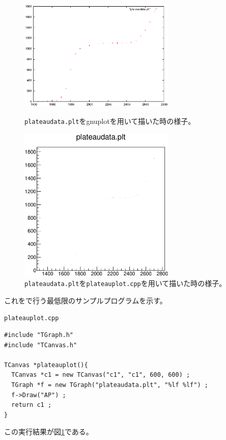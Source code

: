 \begin{figure}[htbp]
  \begin{minipage}{0.47\hsize}
   \begin{center}
    \includegraphics[width = 75mm]{./picture/plateaugnuplot.eps}
   \end{center}
   \caption{\texttt{plateaudata.plt}をgnuplotを用いて描いた時の様子。}
   \label{Fig:plateaugnuplot}
  \end{minipage}
  \begin{minipage}{0.53\hsize}
   \begin{center}
    \includegraphics[width = 75mm]{./picture/plateaucanvas1.eps}
   \end{center}
   \caption{\texttt{plateaudata.plt}を\texttt{plateauplot.cpp}を用いて描いた時の様子。}
   \label{Fig:plateaucanvas1}
  \end{minipage}
 \end{figure}
 
 これを\ROOT で行う最低限のサンプルプログラムを示す。
  \begin{itembox}{\texttt{plateauplot.cpp}}
\begin{verbatim}
#include "TGraph.h"
#include "TCanvas.h"

TCanvas *plateauplot(){
  TCanvas *c1 = new TCanvas("c1", "c1", 600, 600) ;
  TGraph *f = new TGraph("plateaudata.plt", "%lf %lf") ;
  f->Draw("AP") ;
  return c1 ;
}
\end{verbatim}
  \end{itembox}
  この実行結果が図\ref{Fig:plateaucanvas1}である。
  
